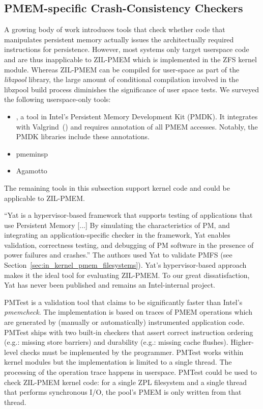 \documentclass[12pt,a4paper,twoside]{book}
\begin{document}
\subsection{PMEM-specific Crash-Consistency Checkers}
A growing body of work introduces tools that check whether code that manipulates persistent memory actually issues the architectually required instructions for persistence.
However, most systems only target userspace code and are thus inapplicable to ZIL-PMEM which is implemented in the ZFS kernel module.
Whereas ZIL-PMEM can be compiled for user-space as part of the \textit{libzpool} library, the large amount of conditional compilation involved in the libzpool build process diminishes the significance of user space tests.
We surveyed the following userspace-only tools:
\begin{itemize}[noitemsep,beginpenalty=100000,midpenalty=100000]
    \item {}, a tool in Intel’s Persistent Memory Development Kit (PMDK).
          It integrates with Valgrind~(\cite{Valgrind}) and requires annotation of all PMEM accesses.
          Notably, the PMDK libraries include these annotations.
    \item pmeminsp
    \item Agamotto 
\end{itemize}
The remaining tools in this subsection support kernel code and could be applicable to ZIL-PMEM.

“Yat is a hypervisor-based framework that supports testing of applications that use Persistent Memory [...]
By simulating the characteristics of PM, and integrating an application-specific checker in the framework, Yat enables validation, correctness testing, and debugging of PM software in the presence of power failures and crashes.”
The authors used Yat to validate PMFS (see Section~\ref{sec:in_kernel_pmem_filesystems}).
Yat's hypervisor-based approach makes it the ideal tool for evaluating ZIL-PMEM.
To our great dissatisfaction, Yat has never been published and remains an Intel-internal project.

PMTest is a validation tool that claims to be significantly faster than Intel's \textit{pmemcheck}.
The implementation is based on traces of PMEM operations which are generated by (manually or automatically) instrumented application code.
PMTest ships with two built-in checkers that assert correct instruction ordering (e.g.: missing store barriers) and durability (e.g.: missing cache flushes).
Higher-level checks must be implemented by the programmer.
PMTest works within kernel modules but the implementation is limited to a single thread.
The processing of the operation trace happens in userspace.
PMTest could be used to check ZIL-PMEM kernel code: for a single ZPL filesystem and a single thread that performs synchronous I/O, the pool's PMEM is only written from that thread.
\end{document}

